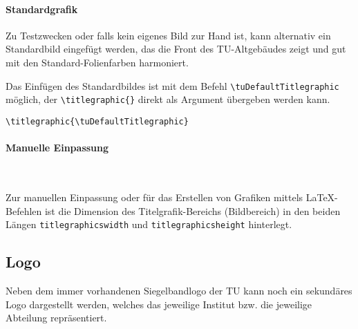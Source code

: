 \paragraph{Standardgrafik}

Zu Testzwecken oder falls kein eigenes Bild zur Hand ist,
kann alternativ ein Standardbild eingefügt werden, das die Front
des TU-Altgebäudes zeigt und gut mit den Standard-Folienfarben harmoniert.

Das Einfügen des Standardbildes ist mit dem Befehl
\linebreak\lstinline{\tuDefaultTitlegraphic} möglich,
der \lstinline!\titlegraphic{}! direkt als Argument übergeben werden kann.

\begin{example}
\begin{lstlisting}
\titlegraphic{\tuDefaultTitlegraphic}
\end{lstlisting}
\end{example}


\paragraph{Manuelle Einpassung}\hfill

\begin{Declaration}
  \\
\end{Declaration}

Zur manuellen Einpassung oder für das Erstellen von Grafiken mittels
\LaTeX-Befehlen ist die Dimension des Titelgrafik-Bereichs (Bildbereich) in den
beiden Längen \lstinline{titlegraphicswidth} und \lstinline{titlegraphicsheight}
hinterlegt.


\subsection{Logo}

Neben dem immer vorhandenen Siegelbandlogo der TU kann noch ein sekundäres Logo
dargestellt werden, welches das jeweilige Institut bzw. die jeweilige Abteilung
repräsentiert.

\begin{Declaration}
\end{Declaration}

